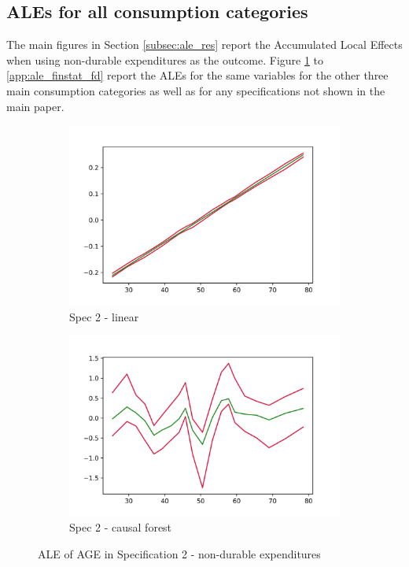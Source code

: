 \subsection{ALEs for all consumption categories} \label{app:ale_res}
The main figures in Section \ref{subsec:ale_res} report the Accumulated Local Effects when using non-durable expenditures as the outcome. Figure \ref{app:ale_age_spec2} to \ref{app:ale_finstat_fd} report the ALEs for the same variables for the other three main consumption categories as well as for any specifications not shown in the main paper. 
\begin{figure}[h!]
    \centering
    \begin{subfigure}{0.5\linewidth}
        \includegraphics[width=\linewidth]{figures/ALE/chNDexp/spec2_linear_AGE.png}
        \caption{Spec 2 - linear}
    \end{subfigure}%
    \begin{subfigure}{0.5\linewidth}
        \includegraphics[width=\linewidth]{figures/ALE/chNDexp/spec2_cf_AGE.png}
        \caption{Spec 2 - causal forest }
    \end{subfigure}
    \caption{ALE of AGE in Specification 2 - non-durable expenditures}
    \label{app:ale_age_spec2}
\end{figure}


